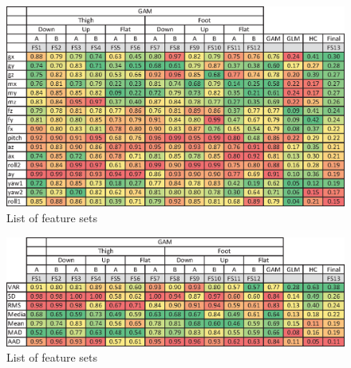 \begin{figure}
\includegraphics{sensorAxes-sortList.eps}
\caption{List of feature sets}
\label{featureList}
\end{figure}
\begin{figure}
\includegraphics{feature-sortList.eps}
\caption{List of feature sets}
\label{featureList}
\end{figure}
